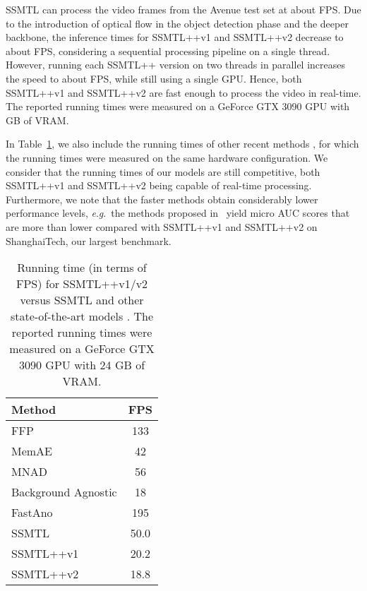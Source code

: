\documentclass[times,twocolumn,final,authoryear]{elsarticle}
\newcommand{\eg}{\textit{e}.\textit{g}.}
\begin{document}
SSMTL can process the video frames from the Avenue test set at about  FPS. Due to the introduction of optical flow in the object detection phase and the deeper backbone, the inference times for SSMTL++v1 and SSMTL++v2 decrease to about  FPS, considering a sequential processing pipeline on a single thread. However, running each SSMTL++ version on two threads in parallel increases the speed to about  FPS, while still using a single GPU. Hence, both SSMTL++v1 and SSMTL++v2 are fast enough to process the video in real-time. The reported running times were measured on a GeForce GTX 3090 GPU with  GB of VRAM.

In Table~\ref{tab_time}, we also include the running times of other recent methods \citep{Georgescu-TPAMI-2021,Gong-ICCV-2019,Liu-CVPR-2018,Park-CVPR-2020,Park-WACV-2022}, for which the running times were measured on the same hardware configuration. We consider that the running times of our models are still competitive, both SSMTL++v1 and SSMTL++v2 being capable of real-time processing. Furthermore, we note that the faster methods obtain considerably lower performance levels, \eg~the methods proposed in~\citep{Liu-CVPR-2018,Park-CVPR-2020,Park-WACV-2022} yield micro AUC scores that are more than  lower compared with SSMTL++v1 and SSMTL++v2 on ShanghaiTech, our largest benchmark.

\begin{table}[t]
\caption{Running time (in terms of FPS) for SSMTL++v1/v2 versus SSMTL and other state-of-the-art models \citep{Liu-CVPR-2018,Gong-ICCV-2019,Park-CVPR-2020,Georgescu-TPAMI-2021,Park-WACV-2022}. The reported running times were measured on a GeForce GTX 3090 GPU with 24 GB of VRAM.}\label{tab_time}
\begin{center}
\begin{tabular}{|l|c|}
\hline
{Method}                         & {FPS} \\

\hline\hline
 
FFP \citep{Liu-CVPR-2018} & 133 \\   
MemAE  \citep{Gong-ICCV-2019}  & 42 \\
MNAD  \citep{Park-CVPR-2020} & 56 \\
Background Agnostic \citep{Georgescu-TPAMI-2021} & 18 \\
FastAno \citep{Park-WACV-2022} & 195 \\ 

\hline
SSMTL \citep{Georgescu-CVPR-2021} & 50.0 \\  SSMTL++v1                        & 20.2 \\  SSMTL++v2                        & 18.8 \\  \hline
\end{tabular}
\end{center}
\end{table}
\end{document}
